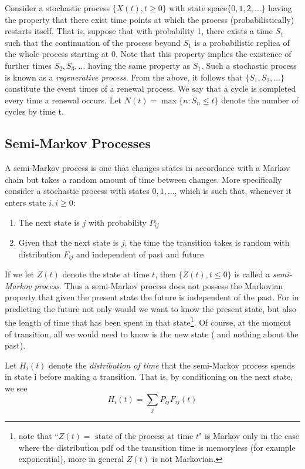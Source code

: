 Consider a stochastic process $\{X(t), t \geq 0\}$ with state space$\{0, 1, 2, ... \}$ having
the property that there exist time points at which the process (probabilistically) restarts itself. That is, suppose that with probability 1, there exists a time $S_1$
such that the continuation of the process beyond $S_1$ is a probabilistic replica
of the whole process starting at 0. Note that this property implies the existence
of further times $S_2 , S_3 , \dots$ having the same property as $S_1$. Such a stochastic
process is known as a \emph{regenerative process}.
From the above, it follows that $\{S_1 , S_2 , ...\}$ constitute the event times of
a renewal process. We say that a cycle is completed every time a renewal
occurs. Let $N(t) = \max\{n: S_n \leq t\}$ denote the number of cycles by time t.

\subsection{Semi-Markov Processes}
A semi-Markov process is one that changes states in accordance with a Markov
chain but takes a random amount of time between changes. More specifically
consider a stochastic process with states $0, 1, ...  $, which is such that, whenever
it enters state $i, i\geq 0$:
\begin{enumerate}
	\item The next state is $j$ with probability $P_{ij}$
	\item Given that the next state is $j$, the time the transition takes is random with distribution $F_{ij}$ and independent of past and future
\end{enumerate}
If we let $Z(t)$ denote the state at time $t$, then $\{Z(t), t\leq 0\}$ is called a \emph{semi-Markov
	process}.
Thus a semi-Markov process does not possess the Markovian property that
given the present state the future is independent of the past. For in predicting
the future not only would we want to know the present state, but also the
length of time that has been spent in that state\footnote{note that ``$Z(t) = \mbox{ state of the process at time } t$" is Markov only in the case where the distribution pdf od the transition time is memoryless (for example exponential), more in general $Z(t)$ is not Markovian.}. Of course, at the moment of transition, all we would need to know is the new state ( and nothing about
the past). %

Let $H_i(t)$ denote the \emph{distribution of time} that the semi-Markov process spends
in state i before making a transition. That is, by conditioning on the next
state, we see
\begin{equation}
H_i(t) = \sum_j P_{ij} F_{ij}(t)
\end{equation}

